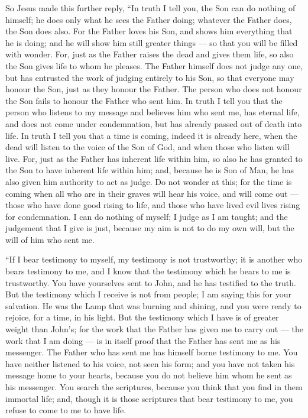  So Jesus made this further reply, ``In truth I tell you,
the Son can do nothing of himself; he does only what he sees the Father
doing; whatever the Father does, the Son does also.  For
the Father loves his Son, and shows him everything that he is doing; and
he will show him still greater things --- so that you will be filled
with wonder.  For, just as the Father raises the dead and
gives them life, so also the Son gives life to whom he pleases.
 The Father himself does not judge any one, but has
entrusted the work of judging entirely to his Son,  so that
everyone may honour the Son, just as they honour the Father. The person
who does not honour the Son fails to honour the Father who sent him.
 In truth I tell you that the person who listens to my
message and believes him who sent me, has eternal life, and does not
come under condemnation, but has already passed out of death into life.
 In truth I tell you that a time is coming, indeed it is
already here, when the dead will listen to the voice of the Son of God,
and when those who listen will live.  For, just as the
Father has inherent life within him, so also he has granted to the Son
to have inherent life within him;  and, because he is Son
of Man, he has also given him authority to act as judge. 
Do not wonder at this; for the time is coming when all who are in their
graves will hear his voice,  and will come out --- those
who have done good rising to life, and those who have lived evil lives
rising for condemnation.  I can do nothing of myself; I
judge as I am taught; and the judgement that I give is just, because my
aim is not to do my own will, but the will of him who sent me.

 ``If I bear testimony to myself, my testimony is not
trustworthy;  it is another who bears testimony to me, and
I know that the testimony which he bears to me is trustworthy.
 You have yourselves sent to John, and he has testified to
the truth.  But the testimony which I receive is not from
people; I am saying this for your salvation.  He was the
Lamp that was burning and shining, and you were ready to rejoice, for a
time, in his light.  But the testimony which I have is of
greater weight than John's; for the work that the Father has given me to
carry out --- the work that I am doing --- is in itself proof that the
Father has sent me as his messenger.  The Father who has
sent me has himself borne testimony to me. You have neither listened to
his voice, not seen his form;  and you have not taken his
message home to your hearts, because you do not believe him whom he sent
as his messenger.  You search the scriptures, because you
think that you find in them immortal life; and, though it is those
scriptures that bear testimony to me,  you refuse to come
to me to have life.

